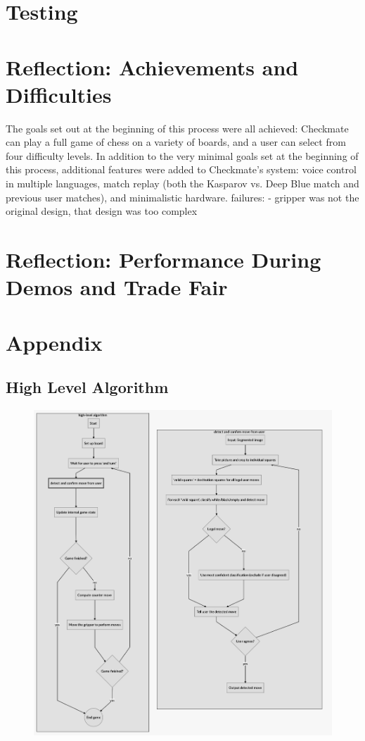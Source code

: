 \documentclass[onecolumn]{IEEEtran}
\begin{document}
\section{Testing}
\section{Reflection: Achievements and Difficulties}
The goals set out at the beginning of this process were all achieved: Checkmate can play a full game of chess on a variety of boards, and a user can select from four difficulty levels. In addition to the very minimal goals set at the beginning of this process, additional features were added to Checkmate's system: voice control in multiple languages, match replay (both the Kasparov vs. Deep Blue match and previous user matches), and minimalistic hardware. 
failures:
- gripper was not the original design, that design was too complex


\section{Reflection: Performance During Demos and Trade Fair}
\section{Appendix}

\subsection{High Level Algorithm}

\begin{figure}[h!]
  \centering
  \includegraphics[scale = .3]{white_square.png}
\end{figure}
\end{document}
